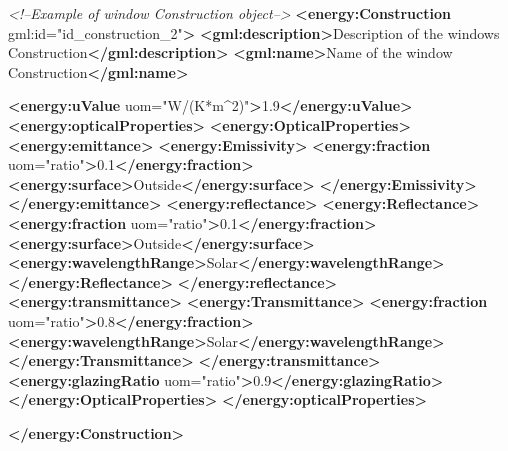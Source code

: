 \documentclass[a4paper,12pt]{article}
\newenvironment{Shaded}{}{}
\newcommand{\KeywordTok}[1]{\textcolor[rgb]{0.00,0.44,0.13}{\textbf{{#1}}}}
\newcommand{\StringTok}[1]{\textcolor[rgb]{0.25,0.44,0.63}{{#1}}}
\newcommand{\CommentTok}[1]{\textcolor[rgb]{0.38,0.63,0.69}{\textit{{#1}}}}
\newcommand{\OtherTok}[1]{\textcolor[rgb]{0.00,0.44,0.13}{{#1}}}
\newcommand{\NormalTok}[1]{{#1}}
\begin{document}
\begin{Shaded}
\begin{Highlighting}[]
\CommentTok{<!--Example of window Construction object-->}
\KeywordTok{<energy:Construction}\OtherTok{ gml:id=}\StringTok{"id_construction_2"}\KeywordTok{>}
    \KeywordTok{<gml:description>}\NormalTok{Description of the windows Construction}\KeywordTok{</gml:description>}
    \KeywordTok{<gml:name>}\NormalTok{Name of the window Construction}\KeywordTok{</gml:name>}

    \KeywordTok{<energy:uValue}\OtherTok{ uom=}\StringTok{"W/(K*m^2)"}\KeywordTok{>}\NormalTok{1.9}\KeywordTok{</energy:uValue>}
    \KeywordTok{<energy:opticalProperties>}
        \KeywordTok{<energy:OpticalProperties>}
            \KeywordTok{<energy:emittance>}
                \KeywordTok{<energy:Emissivity>}
                    \KeywordTok{<energy:fraction}\OtherTok{ uom=}\StringTok{"ratio"}\KeywordTok{>}\NormalTok{0.1}\KeywordTok{</energy:fraction>}
                    \KeywordTok{<energy:surface>}\NormalTok{Outside}\KeywordTok{</energy:surface>}
                \KeywordTok{</energy:Emissivity>}
            \KeywordTok{</energy:emittance>}
            \KeywordTok{<energy:reflectance>}
                \KeywordTok{<energy:Reflectance>}
                    \KeywordTok{<energy:fraction}\OtherTok{ uom=}\StringTok{"ratio"}\KeywordTok{>}\NormalTok{0.1}\KeywordTok{</energy:fraction>}
                    \KeywordTok{<energy:surface>}\NormalTok{Outside}\KeywordTok{</energy:surface>}
                    \KeywordTok{<energy:wavelengthRange>}\NormalTok{Solar}\KeywordTok{</energy:wavelengthRange>}
                \KeywordTok{</energy:Reflectance>}
            \KeywordTok{</energy:reflectance>}
            \KeywordTok{<energy:transmittance>}
                \KeywordTok{<energy:Transmittance>}
                    \KeywordTok{<energy:fraction}\OtherTok{ uom=}\StringTok{"ratio"}\KeywordTok{>}\NormalTok{0.8}\KeywordTok{</energy:fraction>}
                    \KeywordTok{<energy:wavelengthRange>}\NormalTok{Solar}\KeywordTok{</energy:wavelengthRange>}
                \KeywordTok{</energy:Transmittance>}
            \KeywordTok{</energy:transmittance>}
            \KeywordTok{<energy:glazingRatio}\OtherTok{ uom=}\StringTok{"ratio"}\KeywordTok{>}\NormalTok{0.9}\KeywordTok{</energy:glazingRatio>}
        \KeywordTok{</energy:OpticalProperties>}
    \KeywordTok{</energy:opticalProperties>}

\KeywordTok{</energy:Construction>}
\end{Highlighting}
\end{Shaded}
\end{document}
